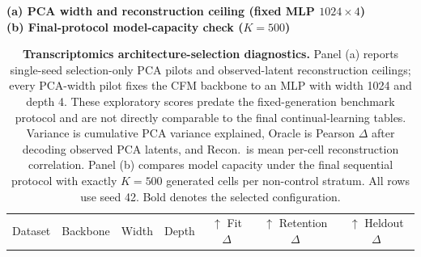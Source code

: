 \begin{table}[t]
\centering
\small
\caption{\textbf{Transcriptomics architecture-selection diagnostics.} Panel (a) reports single-seed selection-only PCA pilots and observed-latent reconstruction ceilings; every PCA-width pilot fixes the CFM backbone to an MLP with width 1024 and depth 4. These exploratory scores predate the fixed-generation benchmark protocol and are not directly comparable to the final continual-learning tables. Variance is cumulative PCA variance explained, Oracle is Pearson $\Delta$ after decoding observed PCA latents, and Recon.\ is mean per-cell reconstruction correlation. Panel (b) compares model capacity under the final sequential protocol with exactly $K=500$ generated cells per non-control stratum. All rows use seed 42. Bold denotes the selected configuration.}
\label{tab:tx_architecture_selection}
\textbf{(a) PCA width and reconstruction ceiling (fixed MLP $1024{\times}4$)}\\[2pt]
\vspace{6pt}
\textbf{(b) Final-protocol model-capacity check ($K=500$)}\\[2pt]
\begin{tabular}{@{}llccccc@{}}
\toprule
Dataset & Backbone & Width & Depth & $\uparrow$ Fit $\Delta$ & $\uparrow$ Retention $\Delta$ & $\uparrow$ Heldout $\Delta$ \\

\end{tabular}
\end{table}
